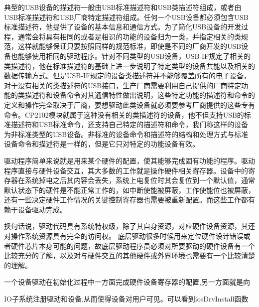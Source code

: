典型的USB设备的描述符一般由USB标准描述符和USB类描述符组成，或者由USB标准描述符和USB厂商特定描述符组成。任何一个USB设备都必须包含USB标准描述符，他提供了设备的基本信息和通信方式。为了简化USB设备的开发过程，通常会将具有相同的或者是相识的功能的设备归为一类，并指定相关的类规范，这样就能够保证只要按照同样的规范标准，即使是不同的厂商开发的USB设备也能够使用相同的驱动程序。针对不同类型的USB设备，USB-IF规定了相关的类描述符，他在标准描述符的基础上进一步说明了特定类型的设备共能以及相关的数据传输方式。但是USB-IF规定的设备类描述符并不能够覆盖所有的电子设备，对于没有相关的类描述符的USB接口，生产厂商需要利用自己提供的厂商特定功能的类描述符和设备命令对其通信特性做出说明，这些特定功能的描述符和命令的定义和操作完全取决于厂商，要想驱动此类设备就必须要参考厂商提供的这些专有命令。CP2102模块就属于这种没有相关的类描述符的设备，他不但支持USB的标准描述符和USB标准命令，还支持自己特定的描述符和命令，我们称这样的设备为非标准类型的USB设备。非标准的设备命令和描述符的结构和处理方式与标准设备命令和描述符是一样的，但是它只对特定的功能设备有效。
























驱动程序简单来说就是用来某个硬件的配置，使其能够完成固有功能的程序。驱动程序直接与硬件设备交互，其大多数的工作就是操作硬件相关寄存器。设备中的寄存器在系统掉电之后其内容会丢失，系统上电复位时其会复位到一个默认值，通常默认状态下的硬件是不能正常工作的，如中断使能被屏蔽，工作使能位也被屏蔽，还有一些决定硬件工作情况的关键控制寄存器也需要被重新配置。而这些工作都有赖于设备驱动完成。

换句话说，驱动代码具有系统特权级，除了其自身资源，对应硬件设备资源，其还对操作系统资源具有完全的访问权。
底层驱动很多时候用来定位硬件设计错误或者硬件芯片本身可能的问题，故底层驱动程序员必须对所要驱动的硬件设备有一个比较充分的了解，以及对与硬件交互的其他硬件或外界环境也需要有一个比较清楚的理解。









一个设备驱动在初始化过程中一方面完成硬件设备寄存器的配置,另一方面就是向

IO子系统注册驱动和设备,从而使得设备对用户可见。可以看到iosDrvInstall函数

